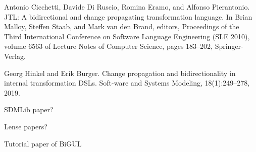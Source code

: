 \documentclass[runningheads]{llncs}
\begin{document}
\begin{thebibliography}{8}
Antonio Cicchetti, Davide Di Ruscio, Romina Eramo, and Alfonso Pierantonio. JTL: A bidirectional and change propagating transformation language. In Brian Malloy, Steffen Staab, and Mark van den Brand, editors, Proceedings of the Third International Conference on Software Language Engineering (SLE 2010), volume 6563 of Lecture Notes of Computer Science, pages 183--202, Springer-Verlag.
  
Georg Hinkel and Erik Burger. Change propagation and bidirectionality in internal transformation DSLs. Soft-ware and Systems Modeling, 18(1):249--278, 2019.

  
  SDMLib paper?

  Lense papers?

  Tutorial paper of BiGUL
  




\end{thebibliography}

% 


\end{document}
